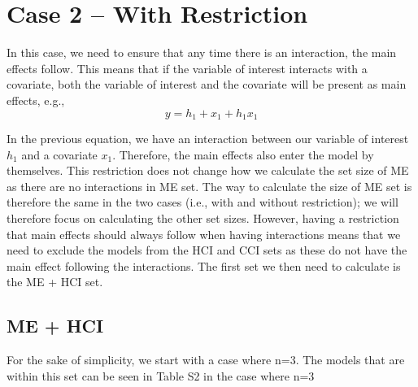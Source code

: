 \section{Case 2 – With Restriction}

In this case, we need to ensure that any time there is an interaction, the main effects follow. This means that if the variable of interest interacts with a covariate, both the variable of interest and the covariate will be present as main effects, e.g.,
\[y=h_1+x_1+h_1x_1\] 

In the previous equation, we have an interaction between our variable of interest $h_1$ and a covariate $x_1$. Therefore, the main effects also enter the model by themselves. This restriction does not change how we calculate the set size of ME as there are no interactions in ME set. The way to calculate the size of ME set is therefore the same in the two cases (i.e., with and without restriction); we will therefore focus on calculating the other set sizes. However, having a restriction that main effects should always follow when having interactions means that we need to exclude the models from the HCI and CCI sets as these do not have the main effect following the interactions. The first set we then need to calculate is the ME + HCI set.

\subsection{ME + HCI}
For the sake of simplicity, we start with a case where n=3. The models that are within this set can be seen in Table S2 in the case where n=3 \\

